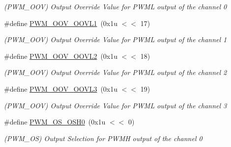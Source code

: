 \begin{DoxyCompactItemize}
\begin{DoxyCompactList}\small\item\em (P\+W\+M\+\_\+\+O\+OV) Output Override Value for P\+W\+ML output of the channel 0 \end{DoxyCompactList}\item 
\mbox{\label{group__SAME70__PWM_ga7fde71f06f7907e95816dc62b79a48e6}} 
\#define \mbox{\hyperlink{group__SAME70__PWM_ga7fde71f06f7907e95816dc62b79a48e6}{P\+W\+M\+\_\+\+O\+O\+V\+\_\+\+O\+O\+V\+L1}}~(0x1u $<$$<$ 17)
\begin{DoxyCompactList}\small\item\em (P\+W\+M\+\_\+\+O\+OV) Output Override Value for P\+W\+ML output of the channel 1 \end{DoxyCompactList}\item 
\mbox{\label{group__SAME70__PWM_gae96833b545645028bb8085ee770f712b}} 
\#define \mbox{\hyperlink{group__SAME70__PWM_gae96833b545645028bb8085ee770f712b}{P\+W\+M\+\_\+\+O\+O\+V\+\_\+\+O\+O\+V\+L2}}~(0x1u $<$$<$ 18)
\begin{DoxyCompactList}\small\item\em (P\+W\+M\+\_\+\+O\+OV) Output Override Value for P\+W\+ML output of the channel 2 \end{DoxyCompactList}\item 
\mbox{\label{group__SAME70__PWM_ga0f9f80a389f9b126dddbe088c413c859}} 
\#define \mbox{\hyperlink{group__SAME70__PWM_ga0f9f80a389f9b126dddbe088c413c859}{P\+W\+M\+\_\+\+O\+O\+V\+\_\+\+O\+O\+V\+L3}}~(0x1u $<$$<$ 19)
\begin{DoxyCompactList}\small\item\em (P\+W\+M\+\_\+\+O\+OV) Output Override Value for P\+W\+ML output of the channel 3 \end{DoxyCompactList}\item 
\mbox{\label{group__SAME70__PWM_ga25f8b6e5987a53e6f03c4a28b00fd809}} 
\#define \mbox{\hyperlink{group__SAME70__PWM_ga25f8b6e5987a53e6f03c4a28b00fd809}{P\+W\+M\+\_\+\+O\+S\+\_\+\+O\+S\+H0}}~(0x1u $<$$<$ 0)
\begin{DoxyCompactList}\small\item\em (P\+W\+M\+\_\+\+OS) Output Selection for P\+W\+MH output of the channel 0 \end{DoxyCompactList}\item 

\end{DoxyCompactItemize}
